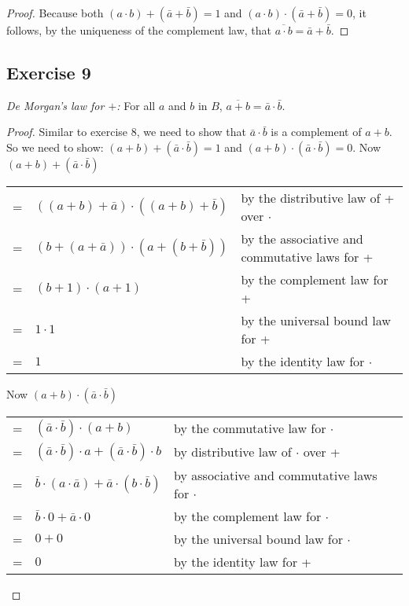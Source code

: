 \documentclass[14pt]{extarticle}
\newcommand{\cy}{\color{cyan}}
\begin{document}
\begin{proof}
  Because both \((a \cdot b) + (\bar{a} + \bar{b}) = 1\) and \((a \cdot b) \cdot (\bar{a} + \bar{b}) = 0\), it follows,
  by the uniqueness of the complement law, that \(\overline{a \cdot b} = \bar{a} + \bar{b}\).
\end{proof}

\subsection{Exercise 9}
{\it De Morgan’s law for $+$:} For all $a$ and $b$ in $B$, \(\overline{a + b} = \bar{a} \cdot \bar{b}\).

\begin{proof}
  Similar to exercise 8, we need to show that \(\bar{a} \cdot \bar{b}\) is a complement of $a+b$. So we need to show: \((a+b) + (\bar{a} \cdot \bar{b}) = 1\) and
  \((a+b) \cdot (\bar{a} \cdot \bar{b}) = 0\). Now \((a+b) + (\bar{a} \cdot \bar{b})\)

  \begin{center}
    \begin{tabular}{cll}
      = & \(((a+b) + \bar{a}) \cdot ((a + b) + \bar{b})\)   & {\cy by the distributive law of + over $\cdot$}     \\
      = & \((b + (a + \bar{a})) \cdot (a + (b + \bar{b}))\) & {\cy by the associative and commutative laws for +} \\
      = & \((b + 1) \cdot (a + 1)\)                         & {\cy by the complement law for +}                   \\
      = & \(1 \cdot 1\)                                     & {\cy by the universal bound law for +}              \\
      = & \(1\)                                             & {\cy by the identity law for $\cdot$}
    \end{tabular}
  \end{center}

  Now \((a+b) \cdot (\bar{a} \cdot \bar{b})\)

  \begin{center}
    \begin{tabular}{cll}
      = & \((\bar{a} \cdot \bar{b}) \cdot (a+b)\)                          & {\cy by the commutative law for $\cdot$}              \\
      = & \((\bar{a}\cdot\bar{b})\cdot a + (\bar{a}\cdot\bar{b}) \cdot b\) & {\cy by distributive law of $\cdot$ over +}           \\
      = & \(\bar{b}\cdot(a\cdot\bar{a})+\bar{a}\cdot(b\cdot\bar{b} )\)     & {\cy by associative and commutative laws for $\cdot$} \\
      = & \(\bar{b} \cdot 0 + \bar{a} \cdot 0\)                            & {\cy by the complement law for $\cdot$}               \\
      = & \(0 + 0\)                                                        & {\cy by the universal bound law for $\cdot$}          \\
      = & \(0\)                                                            & {\cy by the identity law for +}
    \end{tabular}
  \end{center}


\end{proof}
\end{document}
